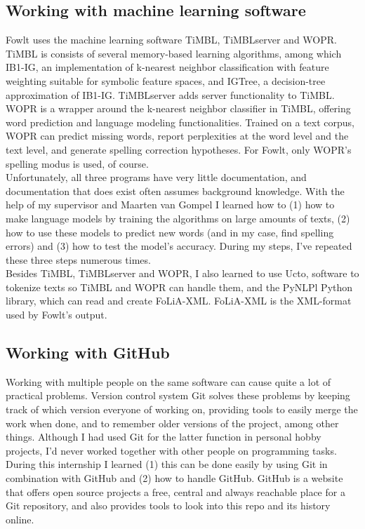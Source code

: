 \documentclass[12pt]{article}
\begin{document}
\subsection{Working with machine learning software}
Fowlt uses the machine learning software TiMBL, TiMBLserver and WOPR. TiMBL is consists of several memory-based learning algorithms, among which IB1-IG, an implementation of k-nearest neighbor classification with feature weighting suitable for symbolic feature spaces, and IGTree, a decision-tree approximation of IB1-IG. TiMBLserver adds server functionality to TiMBL. WOPR is a wrapper around the k-nearest neighbor classifier in TiMBL, offering word prediction and language modeling functionalities. Trained on a text corpus, WOPR can predict missing words, report perplexities at the word level and the text level, and generate spelling correction hypotheses. For Fowlt, only WOPR's spelling modus is used, of course.
\\\indent
Unfortunately, all three programs have very little documentation, and documentation that does exist often assumes background knowledge. With the help of my supervisor and Maarten van Gompel I learned how to (1) how to make language models by training the algorithms on large amounts of texts, (2) how to use these models to predict new words (and in my case, find spelling errors) and (3) how to test the model's accuracy. During my steps, I've repeated these three steps numerous times.
\\\indent
Besides TiMBL, TiMBLserver and WOPR, I also learned to use Ucto, software to tokenize texts so TiMBL and WOPR can handle them, and the PyNLPl Python library, which can read and create FoLiA-XML. FoLiA-XML is the XML-format used by Fowlt's output.

\subsection{Working with GitHub}
Working with multiple people on the same software can cause quite a lot of practical problems. Version control system Git solves these problems by keeping track of which version everyone of working on, providing tools to easily merge the work when done, and to remember older versions of the project, among other things. Although I had used Git for the latter function in personal hobby projects, I'd never worked together with other people on programming tasks. During this internship I learned (1) this can be done easily by using Git in combination with GitHub and (2) how to handle GitHub. GitHub is a website that offers open source projects a free, central and always reachable place for a Git repository, and also provides tools to look into this repo and its history online.
\end{document}
